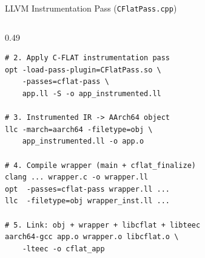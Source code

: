 \documentclass[aspectratio=169]{beamer}
\begin{document}
\begin{frame}[fragile]{LLVM Instrumentation Pass (\texttt{CFlatPass.cpp})}
\begin{columns}[T]
\begin{column}{0.49\textwidth}
\begin{lstlisting}[style=bashstyle]
# 2. Apply C-FLAT instrumentation pass
opt -load-pass-plugin=CFlatPass.so \
    -passes=cflat-pass \
    app.ll -S -o app_instrumented.ll

# 3. Instrumented IR -> AArch64 object
llc -march=aarch64 -filetype=obj \
    app_instrumented.ll -o app.o

# 4. Compile wrapper (main + cflat_finalize)
clang ... wrapper.c -o wrapper.ll
opt  -passes=cflat-pass wrapper.ll ...
llc  -filetype=obj wrapper_inst.ll ...

# 5. Link: obj + wrapper + libcflat + libteec
aarch64-gcc app.o wrapper.o libcflat.o \
    -lteec -o cflat_app
  \end{lstlisting}
\end{column}

\end{columns}
\end{frame}
\end{document}
